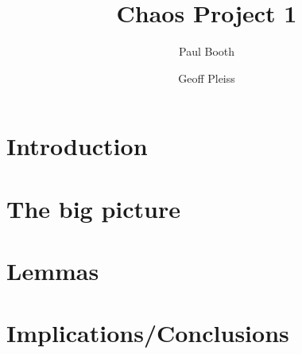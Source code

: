 \documentclass[12pt]{IEEEtran}
\title{Chaos Project 1}
\author{
  Paul Booth \\
  \and
  Geoff Pleiss
}
\date{}
\begin{document}
  \maketitle 

\begin{abstract}
\end{abstract}



\section{Introduction}




\section{The big picture}




\section{Lemmas}



\section{Implications/Conclusions}
\end{document}
